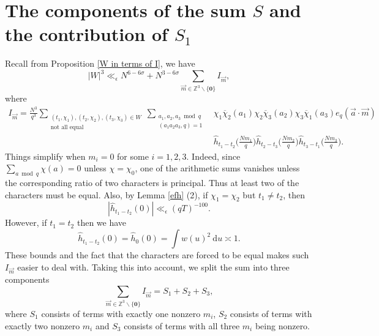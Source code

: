 \documentclass[12pt]{amsart}
\theoremstyle{definition}
\theoremstyle{plain}
\theoremstyle{remark}
\numberwithin{equation}{section}
\numberwithin{theorem}{section}
\numberwithin{equation}{section}
\begin{document}
	\section{\texorpdfstring{The components of the sum $S$ and the contribution of $S_{1}$}
		{The components of the sum S and the contribution of S1}}\label{TcomS}
	\noindent
	Recall from Proposition \ref{W in terms of I}, we have 
	\[ |W|^{3}\ll_{\epsilon} N^{6-6\sigma}+N^{3-6\sigma} \sum_{\overrightarrow{m}\in \mathbb{Z}^{3} \backslash \{\mathbf{0}\}}I_{\overrightarrow{m}},
	\]
	where
	\begin{align*}I_{\overrightarrow{m}}=\frac{N^{3}}{q^{3}}\sum_{\substack{(t_1,\chi_1),(t_2,\chi_2),(t_3,\chi_3) \in W \\ \text{not all equal}}}\sum_{\substack{a_1,a_2,a_3 \bmod q \\ (a_1a_2a_3,q)=1}}&\chi_{1}\overline{\chi}_{2}(a_{1})
		\chi_{2}\overline{\chi}_{3}(a_{2})
		\chi_{3}\overline{\chi}_{1}(a_{3}) e_q(\overrightarrow{a}\cdot\overrightarrow{m})
		\\
		& \hat{h}_{t_{1}-t_{2}}\bigg(\frac{Nm_{1}}{q}\bigg)\hat{h}_{t_{2}-t_{3}}\bigg(\frac{Nm_{2}}{q}\bigg)\hat{h}_{t_{3}-t_{1}}\bigg(\frac{Nm_{3}}{q}\bigg).
	\end{align*}
	Things simplify when $m_i=0$ for some $i=1,2,3$. Indeed, since
	$
	\sum_{a \bmod q}\chi(a)=0
	$
	unless $\chi=\chi_0$, one of the arithmetic sums vanishes unless the
	corresponding ratio of two characters is principal. Thus at least two of the
	characters must be equal. Also, by Lemma \ref{efh} (2), if $\chi_{1}=\chi_{2}$ but $t_{1} \neq t_{2}$, then 
	\begin{equation}\label{case1h}
		|\hat{h}_{t_{1}-t_{2}}(0)|\ll_{\epsilon}(qT)^{-100}.
	\end{equation}
	However, if $t_1=t_2$ then we have
	\begin{equation*}
		\hat{h}_{t_{1}-t_{2}}(0)=\hat{h}_{0}(0)=\int w(u)^{2}\:\mathrm{d}u \asymp 1.
	\end{equation*}
	These bounds and the fact that the characters are forced to be equal makes such $I_{\overrightarrow{m}}$ easier to deal with. Taking this into account, we split the sum into three components
	\begin{equation}\label{ss3}
		\sum_{\overrightarrow{m}\in \mathbb{Z}^{3} \backslash \{\mathbf{0}\}}I_{\overrightarrow{m}}=S_{1}+S_{2}+S_{3},
	\end{equation}
	where $S_{1}$ consists of terms with exactly one nonzero $m_{i}$, $S_{2}$ consists of terms with exactly two nonzero $m_{i}$ and $S_{3}$ consists of terms with all three $m_{i}$ being nonzero.
	
\end{document}
